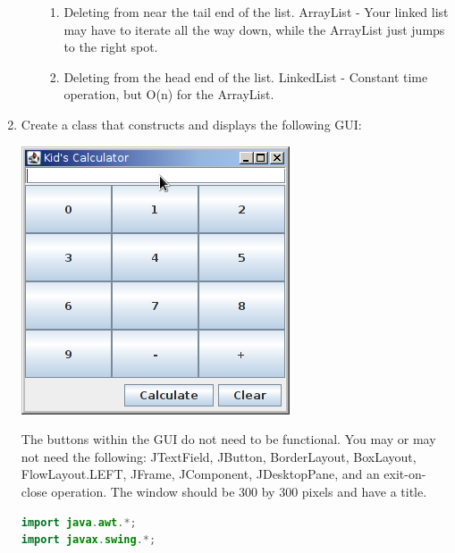 \documentclass[11pt]{article}
\newenvironment{answer}{\large\lstset{basicstyle=\tiny\ttfamily}\color{white} }{}
\newenvironment{answer}{\large\lstset{basicstyle=\large\ttfamily}\color{red} }{}
\begin{document}
\begin{enumerate}
\begin{enumerate}
\begin{enumerate}
		\item Deleting from near the tail end of the list.
		\begin{answer}
		ArrayList - Your linked list may have to iterate all the way down, while the ArrayList just jumps to the right spot.
		\end{answer}
				
		\item Deleting from the head end of the list.
		\begin{answer}
		LinkedList - Constant time operation, but O(n) for the ArrayList.
		\end{answer}
				
	\end{enumerate}

\end{enumerate}  



\newpage
\item Create a class that constructs and displays the following GUI: \\
\begin{minipage}{0.3\textwidth}
\includegraphics[scale=0.6]{calculator.png}
\end{minipage} \hfill
\hspace{50px}
\begin{minipage}{0.5\textwidth}
The buttons within the GUI do not need to be functional.  You may or may not need the following: JTextField, JButton, BorderLayout, BoxLayout, FlowLayout.LEFT, JFrame, JComponent, JDesktopPane, and an exit-on-close operation.  The window should be 300 by 300 pixels and have a title.
\end{minipage}

\begin{answer}
\begin{lstlisting}[language=java]
import java.awt.*;
import javax.swing.*;


\end{lstlisting}
\end{answer}
\end{enumerate}
\end{document}
